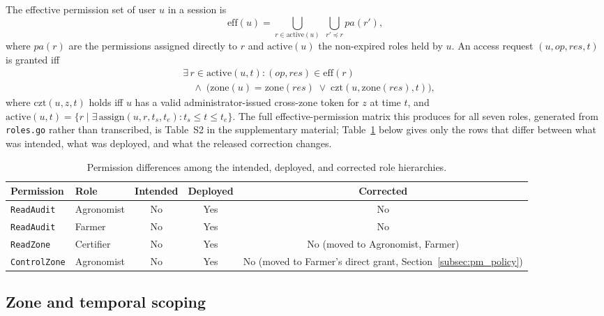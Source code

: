 \documentclass[a4paper,fleqn]{cas-sc}
\begin{document}
The effective permission set of user $u$ in a session is
\begin{equation}
\mathrm{eff}(u) = \bigcup_{r \in \mathrm{active}(u)}
  \; \bigcup_{r' \preceq r} pa(r'),
\end{equation}
where $pa(r)$ are the permissions assigned directly to $r$ and
$\mathrm{active}(u)$ the non-expired roles held by $u$. An access request
$(u, \mathit{op}, \mathit{res}, t)$ is granted iff
\begin{equation}
\begin{aligned}
&\exists\, r \in \mathrm{active}(u,t):
  (\mathit{op},\mathit{res}) \in \mathrm{eff}(r)\\
&\quad \land\;
  \bigl(\mathrm{zone}(u) = \mathrm{zone}(\mathit{res})
  \;\lor\; \mathrm{czt}(u, \mathrm{zone}(\mathit{res}), t)\bigr),
\end{aligned}
\label{eq:grant}
\end{equation}
where $\mathrm{czt}(u,z,t)$ holds iff $u$ has a valid administrator-issued
cross-zone token for $z$ at time $t$, and
$\mathrm{active}(u,t) = \{r \mid \exists\,\mathrm{assign}(u,r,t_s,t_e):
t_s \le t \le t_e\}$. The full effective-permission matrix this produces for
all seven roles, generated from \texttt{roles.go} rather than transcribed,
is Table~S2 in the supplementary material; Table~\ref{tab:permdiff} below
gives only the rows that differ between what was intended, what was
deployed, and what the released correction changes.

\begin{table}[pos=t]
\caption{Permission differences among the intended, deployed, and corrected role hierarchies.}
\label{tab:permdiff}
\small
\begin{tabularx}{\columnwidth}{@{}lXccc@{}}
\toprule
Permission & Role & Intended & Deployed & Corrected \\
\midrule
\texttt{ReadAudit}   & Agronomist & No & Yes & No \\
\texttt{ReadAudit}   & Farmer     & No & Yes & No \\
\texttt{ReadZone}    & Certifier  & No & Yes & No (moved to Agronomist, Farmer) \\
\texttt{ControlZone} & Agronomist & No & Yes & No (moved to Farmer's direct
  grant, Section~\ref{subsec:pm_policy}) \\
\bottomrule
\end{tabularx}
\end{table}

\subsection{Zone and temporal scoping}
\label{subsec:zones}
\end{document}
